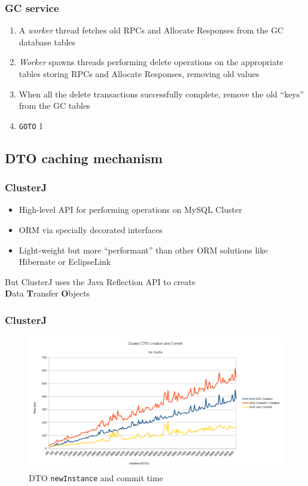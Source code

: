 \documentclass{beamer}
\begin{document}
\begin{frame}
\frametitle{GC service}

\begin{enumerate}
\item A \emph{worker} thread fetches old RPCs and Allocate Responses from the
  GC database tables

\item \emph{Worker} spawns threads performing delete operations on the
  appropriate tables storing RPCs and Allocate Responses, removing old
  values

\item When all the delete transactions successfully complete, remove
  the old ``keys'' from the GC tables

\item \texttt{GOTO} 1
\end{enumerate}
\end{frame}

\subsection{DTO caching mechanism}
\begin{frame}
\frametitle{ClusterJ}

\begin{itemize}
\item High-level API for performing operations on MySQL Cluster
\item ORM via specially decorated interfaces
\item Light-weight but more ``performant'' than other ORM solutions
  like Hibernate or EclipseLink
\end{itemize}

\pause
\centering
\vfill
{\color{red} But ClusterJ uses the Java Reflection API to create\\ \textbf{D}ata
  \textbf{T}ransfer \textbf{O}bjects}
\end{frame}

\begin{frame}
\frametitle{ClusterJ}

\begin{figure}
\centering
\includegraphics[scale=0.35]{resources/dto_create_commit_no_cache.png}
\caption{DTO \texttt{newInstance} and commit time}
\end{figure}
\end{frame}
\end{document}

